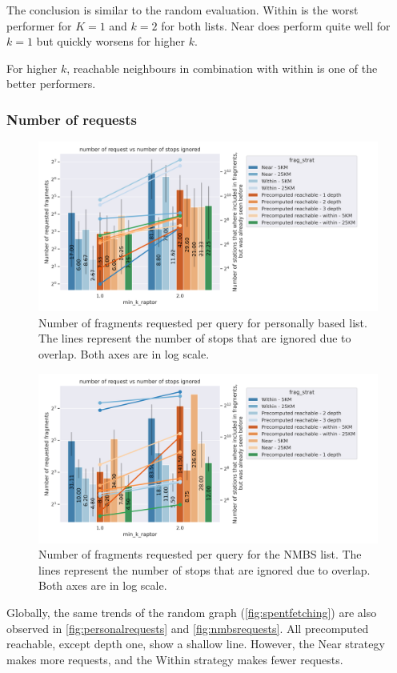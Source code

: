 The conclusion is similar to the random evaluation. Within is the worst performer for $K=1$ and $k=2$ for both lists. 
Near does perform quite well for $k=1$ but quickly worsens for higher $k$. 

For higher $k$, reachable neighbours in combination with within is one of the better performers.
\subsubsection{Number of requests}
\begin{figure}[H]
    \centering
    \includegraphics[width=1.1\textwidth]{images/personal_request.png}
    \caption{Number of fragments requested per query for personally based list. The lines represent the number of stops that are ignored due to overlap. Both axes are in log scale. }
    \label{fig:personalrequests}
\end{figure}
\begin{figure}[H]
    \centering
    \includegraphics[width=1.1\textwidth]{images/nnmb_request.png}
    \caption{Number of fragments requested per query for the NMBS list. The lines represent the number of stops that are ignored due to overlap. Both axes are in log scale. }
    \label{fig:nmbsrequests}
\end{figure}
Globally, the same trends of the random graph (\autoref{fig:spentfetching}) are also observed in \autoref{fig:personalrequests} and \autoref{fig:nmbsrequests}. All precomputed reachable, except depth one, show a shallow line. However, the Near strategy makes more requests, and the Within strategy makes fewer requests.

